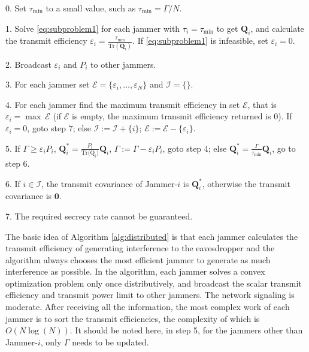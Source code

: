 \documentclass[conference]{IEEEtran}
\begin{document}
\begin{algorithm}
	\caption{}\label{alg:distributed}
	\begin{algorithmic}
		\item[0.] Set $\tau_{\mathrm{min}}$ to a small value, such as $\tau_{\mathrm{min}} = \Gamma/N$. 
		\item[1.] Solve \eqref{eq:subproblem1} for each jammer with $\tau_i = \tau_{\mathrm{min}}$ to get $\mathbf{Q}_i$, and calculate the transmit efficiency $\varepsilon_i = \frac{\tau_{\mathrm{min}}}{\mathrm{Tr}(\mathbf{Q}_i)}$. If \eqref{eq:subproblem1} is infeasible, set $\varepsilon_i = 0$.
		\item[2.] Broadcast $\varepsilon_i$ and $P_i$ to other jammers. 
		\item[3.] For each jammer set $\mathcal{E} =\{ {\varepsilon_i,\ldots, \varepsilon_N}\}$ and $\mathcal{I} =\{\}$.
		\item[4.] For each jammer find the maximum transmit efficiency in set $\mathcal{E}$, that is $\varepsilon_i = \max~\mathcal{E}$ (if $\mathcal{E}$ is empty,  the maximum transmit efficiency returned is 0). If $\varepsilon_i = 0$, goto step 7; else $\mathcal{I} := \mathcal{I} + \{i\}$; $\mathcal{E} := \mathcal{E}  - \{\varepsilon_i\}$.
		\item[5.] If $\Gamma \geq \varepsilon_{i} P_i$, $\mathbf{Q}_{i}^* = \frac{P_i}{\mathrm{Tr(\mathrm{Q}}_i)}\mathbf{Q}_i$, $\Gamma := \Gamma - \varepsilon_iP_i$, goto step 4; else $\mathbf{Q}_{i}^* = \frac{\Gamma}{\tau_\mathrm{min}}\mathbf{Q}_i$, go to step 6.
		\item[6.] If $i \in \mathcal{I}$, the transmit covariance of Jammer-$i$ is $\mathbf{Q}_i^*$, otherwise the transmit covariance is $\mathbf{0}$.
		\item[7.] The required secrecy rate cannot be guaranteed.
	\end{algorithmic}
\end{algorithm}

The basic idea of Algorithm \ref{alg:distributed} is that each jammer calculates the transmit efficiency of generating interference to the eavesdropper and the algorithm always chooses the most efficient jammer to generate as much interference as possible. In the algorithm, each jammer solves a convex optimization problem only once distributively, and broadcast the scalar transmit efficiency and transmit power limit to other jammers. The network signaling is moderate. After receiving all the information, the most complex work of each jammer is to sort the transmit efficiencies, the complexity of which is $O(N\log(N))$. It should be noted here, in step 5, for the jammers other than Jammer-$i$, only $\Gamma$ needs to be updated.
\end{document}
